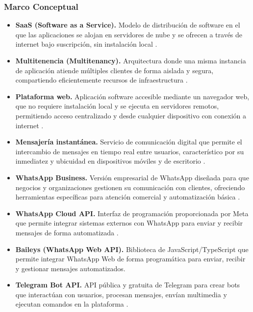 \subsubsection{Marco Conceptual}

\begin{itemize}
    \item \textbf{SaaS (Software as a Service).} Modelo de distribución de software en el que las aplicaciones se alojan en servidores de nube y se ofrecen a través de internet bajo suscripción, sin instalación local \parencite{mellgrance2011}.

	\item \textbf{Multitenencia (Multitenancy).} Arquitectura donde una misma instancia de aplicación atiende múltiples clientes de forma aislada y segura, compartiendo eficientemente recursos de infraestructura \parencite{armbrust2010}.

    \item \textbf{Plataforma web.} Aplicación software accesible mediante un navegador web, que no requiere instalación local y se ejecuta en servidores remotos, permitiendo acceso centralizado y desde cualquier dispositivo con conexión a internet \parencite{nielsen1994}.

    \item \textbf{Mensajería instantánea.} Servicio de comunicación digital que permite el intercambio de mensajes en tiempo real entre usuarios, característico por su inmediatez y ubicuidad en dispositivos móviles y de escritorio \parencite{statista_messaging_2025}.

    \item \textbf{WhatsApp Business.} Versión empresarial de WhatsApp diseñada para que negocios y organizaciones gestionen su comunicación con clientes, ofreciendo herramientas específicas para atención comercial y automatización básica \parencite{meta2024business}.

    \item \textbf{WhatsApp Cloud API.} Interfaz de programación proporcionada por Meta que permite integrar sistemas externos con WhatsApp para enviar y recibir mensajes de forma automatizada \parencite{linocruz2023}.

    \item \textbf{Baileys (WhatsApp Web API).} Biblioteca de JavaScript/TypeScript que permite integrar WhatsApp Web de forma programática para enviar, recibir y gestionar mensajes automatizados.

    \item \textbf{Telegram Bot API.} API pública y gratuita de Telegram para crear bots que interactúan con usuarios, procesan mensajes, envían multimedia y ejecutan comandos en la plataforma \parencite{telegram2024}.


\end{itemize}
